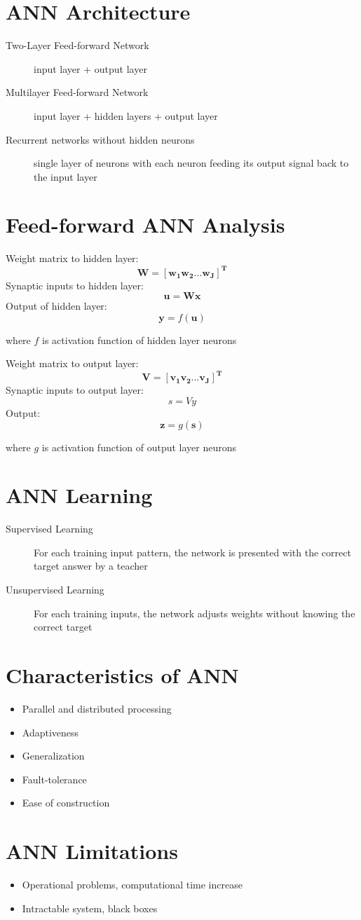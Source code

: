 \section{ANN Architecture}
\begin{description}
\item[Two-Layer Feed-forward Network] input layer + output layer
\item[Multilayer Feed-forward Network] input layer + hidden layers + output layer
\item[Recurrent networks without hidden neurons] single layer of neurons with each neuron feeding its output signal back to the input layer
\end{description}

\section{Feed-forward ANN Analysis}
Weight matrix to hidden layer:
$$\mathbf{W = [w_1w_2 \ldots w_J]^{T}}$$
Synaptic inputs to hidden layer:
$$\mathbf{u=Wx}$$
\clearpage
\noindent Output of hidden layer:
$$\mathbf{y}=f(\mathbf{u})$$
\begin{center}where $f$ is activation function of hidden layer neurons \end{center}
Weight matrix to output layer:
$$\mathbf{V = [v_1v_2 \ldots v_J]^{T}}$$
Synaptic inputs to output layer:
$$s=Vy$$
Output:
$$\mathbf{z} = g(\mathbf{s})$$
\begin{center}where $g$ is activation function of output layer neurons \end{center}

\section{ANN Learning}
\begin{description}
\item[Supervised Learning] For each training input pattern, the network is presented with the correct target answer by a teacher
\item[Unsupervised Learning] For each training inputs, the network adjusts weights without knowing the correct target
\end{description}

\section{Characteristics of ANN}
\begin{itemize}
\item Parallel and distributed processing
\item Adaptiveness
\item Generalization
\item Fault-tolerance
\item Ease of construction
\end{itemize}

\section{ANN Limitations}
\begin{itemize}
\item Operational problems, computational time increase
\item Intractable system, black boxes
\end{itemize}